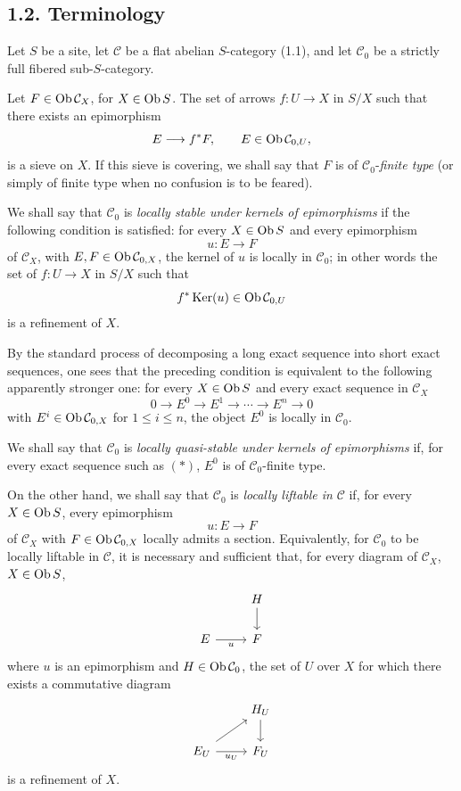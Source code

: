 \documentclass[11pt]{article}
\providecommand{\Ker}{\operatorname{Ker}}
\begin{document}
\subsection*{1.2. Terminology}

Let \(S\) be a site, let \(\mathcal C\) be a flat abelian \(S\)-category (1.1), and let \(\mathcal C_0\) be a strictly full fibered sub-\(S\)-category.

Let \(F\in\operatorname{Ob} \mathcal C_X\), for \(X\in\operatorname{Ob} S\). The set of arrows \(f:U\to X\) in \(S/X\) such that there exists an epimorphism
\[
  E\longrightarrow f^*F,\qquad E\in\operatorname{Ob} \mathcal C_{0,U},
\]
is a sieve on \(X\). If this sieve is covering, we shall say that \(F\) is of \(\mathcal C_0\)-\emph{finite type} (or simply of finite type when no confusion is to be feared).

We shall say that \(\mathcal C_0\) is \emph{locally stable under kernels of epimorphisms} if the following condition is satisfied: for every \(X\in\operatorname{Ob} S\) and every epimorphism
\[
  u:E\longrightarrow F
\]
of \(\mathcal C_X\), with \(E,F\in\operatorname{Ob}\mathcal C_{0,X}\), the kernel of \(u\) is locally in \(\mathcal C_0\); in other words the set of \(f:U\to X\) in \(S/X\) such that
\[
  f^*\Ker(u)\in\Ob\mathcal C_{0,U}
\]
is a refinement of \(X\).

By the standard process of decomposing a long exact sequence into short exact sequences, one sees that the preceding condition is equivalent to the following apparently stronger one: for every \(X\in\operatorname{Ob} S\) and every exact sequence in \(\mathcal C_X\)
\begin{equation}\tag{*}
  0\longrightarrow E^0\longrightarrow E^1\longrightarrow\cdots\longrightarrow E^n\longrightarrow 0
\end{equation}
with \(E^i\in\operatorname{Ob}\mathcal C_{0,X}\) for \(1\leq i\leq n\), the object \(E^0\) is locally in \(\mathcal C_0\).

We shall say that \(\mathcal C_0\) is \emph{locally quasi-stable under kernels of epimorphisms} if, for every exact sequence such as \((*)\), \(E^0\) is of \(\mathcal C_0\)-finite type.

On the other hand, we shall say that \(\mathcal C_0\) is \emph{locally liftable in} \(\mathcal C\) if, for every \(X\in\operatorname{Ob} S\), every epimorphism
\[
  u:E\longrightarrow F
\]
of \(\mathcal C_X\) with \(F\in\operatorname{Ob}\mathcal C_{0,X}\) locally admits a section. Equivalently, for \(\mathcal C_0\) to be locally liftable in \(\mathcal C\), it is necessary and sufficient that, for every diagram of \(\mathcal C_X\), \(X\in\operatorname{Ob} S\),
\[
\begin{tikzcd}
& H \arrow[d]\\
E \arrow[r,"u"'] & F
\end{tikzcd}
\]
where \(u\) is an epimorphism and \(H\in\operatorname{Ob}\mathcal C_0\), the set of \(U\) over \(X\) for which there exists a commutative diagram
\[
\begin{tikzcd}
& H_U \arrow[d]\\
E_U \arrow[r,"u_U"'] \arrow[ur] & F_U
\end{tikzcd}
\]
is a refinement of \(X\).
\end{document}
